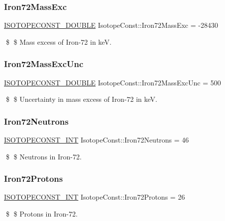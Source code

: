 \subsubsection{\texorpdfstring{Iron72\+Mass\+Exc}{Iron72MassExc}}
{\footnotesize\ttfamily \mbox{\hyperlink{group___isotope_const-_macros_ga8f45a7272ce02c0b4c65c44636ed719a}{I\+S\+O\+T\+O\+P\+E\+C\+O\+N\+S\+T\+\_\+\+D\+O\+U\+B\+LE}} Isotope\+Const\+::\+Iron72\+Mass\+Exc = -\/28430}

\$ \$ Mass excess of Iron-\/72 in keV. \mbox{\label{group___isotope_const-_iron-_fe72_ga9adfbb9b4a9f1a3fe9d889ee588a6c7c}} 
\subsubsection{\texorpdfstring{Iron72\+Mass\+Exc\+Unc}{Iron72MassExcUnc}}
{\footnotesize\ttfamily \mbox{\hyperlink{group___isotope_const-_macros_ga8f45a7272ce02c0b4c65c44636ed719a}{I\+S\+O\+T\+O\+P\+E\+C\+O\+N\+S\+T\+\_\+\+D\+O\+U\+B\+LE}} Isotope\+Const\+::\+Iron72\+Mass\+Exc\+Unc = 500}

\$ \$ Uncertainty in mass excess of Iron-\/72 in keV. \mbox{\label{group___isotope_const-_iron-_fe72_ga884c3a2cde1de8bcd23d706c13bd869d}} 
\subsubsection{\texorpdfstring{Iron72\+Neutrons}{Iron72Neutrons}}
{\footnotesize\ttfamily \mbox{\hyperlink{group___isotope_const-_macros_ga5f18360b3e99483a35c32d789e62621c}{I\+S\+O\+T\+O\+P\+E\+C\+O\+N\+S\+T\+\_\+\+I\+NT}} Isotope\+Const\+::\+Iron72\+Neutrons = 46}

\$ \$ Neutrons in Iron-\/72. \mbox{\label{group___isotope_const-_iron-_fe72_ga759a14d5da8071bdb7910aa4a8379734}} 
\subsubsection{\texorpdfstring{Iron72\+Protons}{Iron72Protons}}
{\footnotesize\ttfamily \mbox{\hyperlink{group___isotope_const-_macros_ga5f18360b3e99483a35c32d789e62621c}{I\+S\+O\+T\+O\+P\+E\+C\+O\+N\+S\+T\+\_\+\+I\+NT}} Isotope\+Const\+::\+Iron72\+Protons = 26}

\$ \$ Protons in Iron-\/72. 